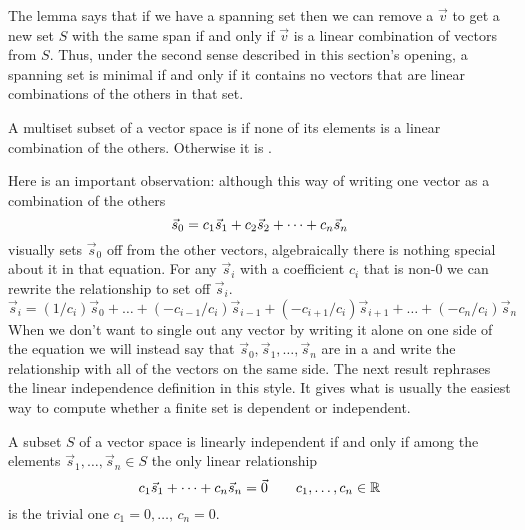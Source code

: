 The lemma says that if we have a spanning set 
then we can remove a $\vec{v}$ to get a new set $S$ 
with the same span if and only if
$\vec{v}$ is a linear combination of vectors from $S$.
Thus, under the second sense described in this section's opening, 
a spanning set is minimal
if and only if it contains
no vectors that are linear combinations of the others in that set.

\begin{definition}
\label{def:LinInd}
A multiset subset of a vector space is
%
if none of its elements is a linear combination of the 
others.
Otherwise it is .
\end{definition}

Here is an important observation:
although this way of writing one vector as a combination of the others
\begin{equation*}
   \vec{s}_0=c_1\vec{s}_1+c_2\vec{s}_2+\cdots +c_n\vec{s}_n
\end{equation*}
visually sets \( \vec{s}_0 \) off from the other vectors, algebraically
there is nothing special about it in that equation.
For any \( \vec{s}_i \) with a coefficient $c_i$ that is non-$0$
we can rewrite the relationship to set off \( \vec{s}_i \).
\begin{equation*}
   \vec{s}_i=(1/c_i)\vec{s}_0+\dots
              +(-c_{i-1}/c_i)\vec{s}_{i-1}+(-c_{i+1}/c_i)\vec{s}_{i+1}
              +\dots+(-c_n/c_i)\vec{s}_n
\end{equation*}
When we don't want to single out any vector by writing it alone on
one side of the equation we will instead say that
\( \vec{s}_0,\vec{s}_1,\dots,\vec{s}_n \) are in a
%
and write the relationship
with all of the vectors on the same side.
The next result rephrases the linear independence definition in this style.
It gives what is usually the easiest way to compute whether
a finite set is dependent or independent.

\begin{lemma}   \label{le:LDIffANonTrivLinRel}
A subset \( S \) of a vector space is linearly independent if and only if 
among the elements \( \vec{s}_1,\dots,\vec{s}_n\in S \) 
the only linear relationship 
\begin{equation*}
   c_1\vec{s}_1+\dots+c_n\vec{s}_n=\vec{0}
   \qquad c_1,\dots,c_n\in\mathbb{R}
\end{equation*}
is the trivial one \( c_1=0,\dots,\,c_n=0 \).
\end{lemma}

